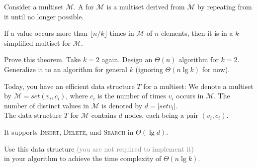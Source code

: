 \begin{frame}{}
  
  \begin{definition}
    Consider a multiset $\mathcal{M}$.
    A  for $\mathcal{M}$ is a multiset derived from $\mathcal{M}$
    by repeating  from it until no longer possible.

  \end{definition}


  \begin{theorem}
    If a value occurs more than $\lfloor n / k \rfloor$ times in $\mathcal{M}$ of $n$ elements,
    then it is in a $k$-simplified multiset for $\mathcal{M}$.
  \end{theorem}

  Prove this theorem. Take $k = 2$ again. Design an $\Theta(n)$ algorithm for $k = 2$. 
  Generalize it to an algorithm for general $k$ (ignoring $\Theta(n \lg k)$ for now).
\end{frame}

\begin{frame}{}

  \vspace{0.30cm}
  \begin{exampleblock}{Today, you have an efficient data structure $T$ for a multiset:}
    We denote a multiset by $\mathcal{M} = set{(v_i, c_i)}$,
    where $c_i$ is the number of times $v_i$ occurs in $\mathcal{M}$.
    The number of distinct values in $\mathcal{M}$ is denoted by $d = |set{v_i}|$.\\[6pt]

    The data structure $T$ for $\mathcal{M}$ contains $d$ nodes, each being a pair $(v_i, c_i)$.

    It supports \textsc{Insert}, \textsc{Delete}, and \textsc{Search} in $\Theta(\lg d)$.
  \end{exampleblock}

  \begin{center}
    Use this data structure \textcolor{gray}{\small (you are not required to implement it)} \\
    in your algorithm to achieve the time complexity of $\Theta(n \lg k)$.
  \end{center}
\end{frame}

